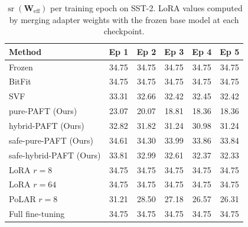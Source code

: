 \begin{table}[t]
\centering
\caption{$\operatorname{sr}(\mathbf{W}_{\text{eff}})$ per training epoch on SST-2. LoRA values computed by merging adapter weights with the frozen base model at each checkpoint.}
\label{tab:training_dynamics}
\begin{tabular}{lccccc}
\toprule
\textbf{Method} & \textbf{Ep 1} & \textbf{Ep 2} & \textbf{Ep 3} & \textbf{Ep 4} & \textbf{Ep 5} \\
\midrule
Frozen & 34.75 & 34.75 & 34.75 & 34.75 & 34.75 \\
BitFit & 34.75 & 34.75 & 34.75 & 34.75 & 34.75 \\
\midrule
SVF & 33.31 & 32.66 & 32.42 & 32.45 & 32.42 \\
pure-PAFT (Ours) & 23.07 & 20.07 & 18.81 & 18.36 & 18.36 \\
hybrid-PAFT (Ours) & 32.82 & 31.82 & 31.24 & 30.98 & 31.24 \\
safe-pure-PAFT (Ours) & 34.61 & 34.30 & 33.99 & 33.86 & 33.84 \\
safe-hybrid-PAFT (Ours) & 33.81 & 32.99 & 32.61 & 32.37 & 32.33 \\
\midrule
LoRA $r{=}8$ & 34.75 & 34.75 & 34.75 & 34.75 & 34.75 \\
LoRA $r{=}64$ & 34.75 & 34.75 & 34.75 & 34.75 & 34.75 \\
PoLAR $r{=}8$ & 31.21 & 28.50 & 27.18 & 26.57 & 26.31 \\
\midrule
Full fine-tuning & 34.75 & 34.75 & 34.75 & 34.75 & 34.75 \\
\bottomrule
\end{tabular}
\end{table}